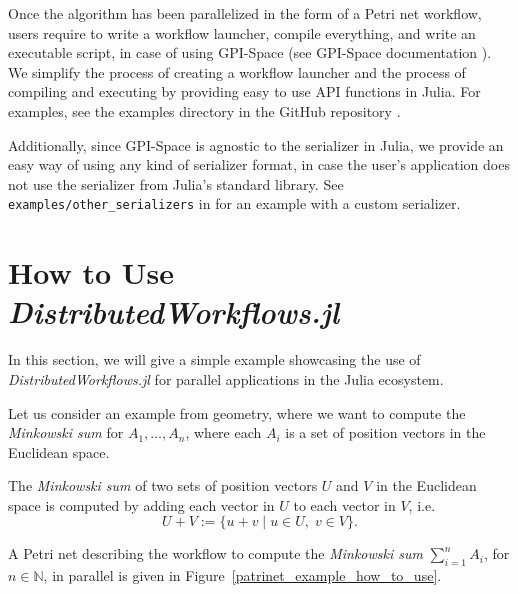 \documentclass{juliacon}
\begin{document}
Once the algorithm has been parallelized in the form of a Petri net workflow, users require to write a workflow launcher, compile everything, and write an executable script, in case of using GPI-Space (see GPI-Space documentation \cite{GSPC}).
We simplify the process of creating a workflow launcher and the process of compiling and executing by providing easy to use API functions in Julia.
For examples, see the examples directory in the GitHub repository \cite{DistributedWorkflows}.\vskip 6pt

Additionally, since GPI-Space is agnostic to the serializer in Julia, we provide an easy way of using any kind of serializer format, in case the user's application does not use the serializer from Julia's standard library.
See \verb+examples/other_serializers+ in \cite{DistributedWorkflows} for an example with a custom serializer.\vskip 6pt


\section{How to Use \emph{DistributedWorkflows.jl}}
\label{sec:how_to_use}

In this section, we will give a simple example showcasing the use of \emph{DistributedWorkflows.jl} for parallel applications in the Julia ecosystem.\vskip 6pt

Let us consider an example from geometry, where we want to compute the \emph{Minkowski sum} for $A_1, \ldots, A_n$, where each $A_i$ is a set of position vectors in the Euclidean space.\vskip 6pt

The \emph{Minkowski sum} of two sets of position vectors $U$ and $V$ in the Euclidean space is computed by adding each vector in $U$ to each vector in $V$, i.e. $$U + V := \{ u+v \; | \; u \in U, \; v \in V \}.$$\vskip 6pt

A Petri net describing the workflow to compute the \emph{Minkowski sum} $\sum_{i=1}^n A_i$, for $n \in \mathbb{N}$, in parallel is given in Figure~\ref{patrinet_example_how_to_use}.\vskip 6pt
\end{document}
